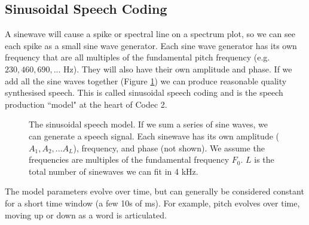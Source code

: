 \documentclass{article}
\begin{document}
{\subsection{Sinusoidal Speech Coding}

A sinewave will cause a spike or spectral line on a spectrum plot, so we can see each spike as a small sine wave generator.  Each sine wave generator has its own frequency that are all multiples of the fundamental pitch frequency (e.g. $230, 460, 690,...$ Hz).  They will also have their own amplitude and phase.  If we add all the sine waves together (Figure \ref{fig:sinusoidal_model}) we can produce reasonable quality synthesised speech.  This is called sinusoidal speech coding and is the speech production ``model" at the heart of Codec 2.

\begin{figure}[h]
\caption{The sinusoidal speech model.  If we sum a series of sine waves, we can generate a speech signal.  Each sinewave has its own amplitude ($A_1,A_2,... A_L$), frequency, and phase (not shown).  We assume the frequencies are multiples of the fundamental frequency $F_0$. $L$ is the total number of sinewaves we can fit in 4 kHz.}
\label{fig:sinusoidal_model}
\begin{center}
\end{center}
\end{figure}

The model parameters evolve over time, but can generally be considered constant for a short time window (a few 10s of ms).  For example, pitch evolves over time, moving up or down as a word is articulated.

}
\end{document}
